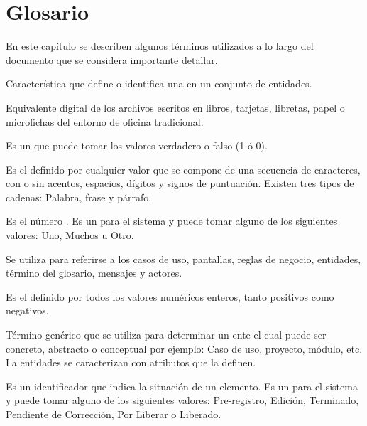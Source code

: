 \section{Glosario}
\label{sec:glosario}
    En este capítulo se describen algunos términos utilizados a lo largo del documento que se considera importante detallar. 
  
\begin{description}
	 Característica que define o identifica una  en un conjunto de entidades.

	 Equivalente digital de los archivos escritos en libros, tarjetas, libretas, papel o microfichas del entorno de oficina tradicional.

	 Es un  que puede tomar los valores verdadero o falso (1 ó 0).
	
	 Es el  definido por cualquier valor que se compone de una secuencia de caracteres, con o sin acentos, espacios, dígitos y 
	signos de puntuación. Existen tres tipos de cadenas: Palabra, frase y párrafo.
	
	 Es el número . Es un  para el sistema y puede tomar alguno de los siguientes valores:
	Uno, Muchos u Otro.

	 Se utiliza para referirse a los casos de uso, pantallas, reglas de negocio, entidades, término del glosario, mensajes y actores.
	
	 Es el   definido por todos los valores numéricos enteros, tanto positivos como negativos.
	
	 Término genérico que se utiliza para determinar un ente el cual puede ser concreto, abstracto o conceptual por ejemplo: Caso de uso, 
		proyecto, módulo, etc. La entidades se caracterizan con atributos que la definen.		
		
	 Es un identificador que indica la situación de un elemento. Es un  para el sistema y puede tomar alguno de los siguientes valores:
	Pre-registro, Edición, Terminado, Pendiente de Corrección, Por Liberar o Liberado.
	

\end{description}
